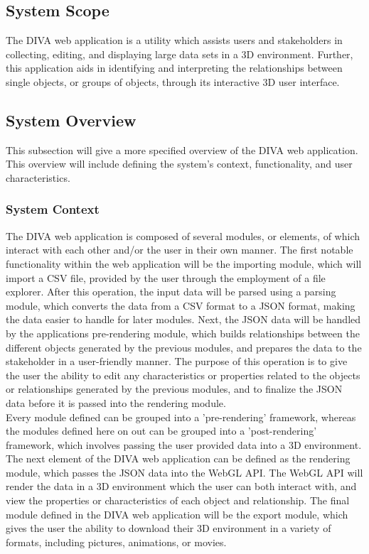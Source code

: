 \documentclass[journal,10pt,onecolumn,compsoc]{IEEEtran} \usepackage[margin=1.0in]{geometry} \usepackage{pdfpages}
\begin{document}
    \subsection{System Scope}
    \noindent The DIVA web application is a utility which assists users and stakeholders in collecting, editing, and displaying large data sets in a 3D environment. Further, this application aids in identifying and interpreting the relationships between single objects, or groups of objects, through its interactive 3D user interface. 

    \subsection{System Overview}
    \noindent This subsection will give a more specified overview of the DIVA web application. This overview will include defining the system's context, functionality, and user characteristics. 
        \subsubsection{System Context}
        The DIVA web application is composed of several modules, or elements, of which interact with each other and/or the user in their own manner. The first notable functionality within the web application will be the importing module, which will import a CSV file, provided by the user through the employment of a file explorer. After this operation, the input data will be parsed using a parsing module, which converts the data from a CSV format to a JSON format, making the data easier to handle for later modules. Next, the JSON data will be handled by the applications pre-rendering module, which builds relationships between the different objects generated by the previous modules, and prepares the data to the stakeholder in a user-friendly manner. The purpose of this operation is to give the user the ability to edit any characteristics or properties related to the objects or relationships generated by the previous modules, and to finalize the JSON data before it is passed into the rendering module. \\
        \newline Every module defined can be grouped into a 'pre-rendering' framework, whereas the modules defined here on out can be grouped into a 'post-rendering' framework, which involves passing the user provided data into a 3D environment. The next element of the DIVA web application can be defined as the rendering module, which passes the JSON data into the WebGL API. The WebGL API will render the data in a 3D environment which the user can both interact with, and view the properties or characteristics of each object and relationship. The final module defined in the DIVA web application will be the export module, which gives the user the ability to download their 3D environment in a variety of formats, including pictures, animations, or movies. 
\end{document}

